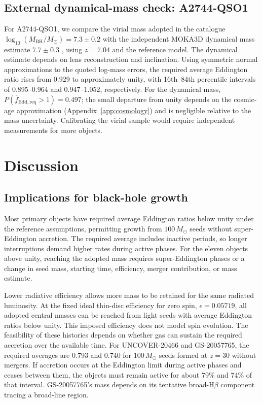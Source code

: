 \documentclass[pdflatex,sn-basic]{sn-jnl}
\newcommand{\mbh}{M_{\mathrm{BH}}}
\begin{document}
\subsection{External dynamical-mass check: A2744-QSO1}
\label{sec:direct}

For A2744-QSO1, we compare the virial mass adopted in the catalogue
$\log_{10}(\mbh/M_\odot)=7.3\pm0.2$ \citep{greene2024} with the independent MOKA3D dynamical mass estimate $7.7\pm0.3$ \citep{juodzbalis_direct2025}, using $z=7.04$
and the reference model. The dynamical estimate depends on lens reconstruction and inclination.
Using symmetric normal approximations to the quoted log-mass errors, the
required average Eddington ratio rises from 0.929 to approximately unity, with
16th--84th percentile intervals of 0.895--0.964 and 0.947--1.052,
respectively. For the dynamical mass, $P(\overline{f}_{\mathrm{Edd,req}}>1)=0.497$;
the small departure from unity depends on the cosmic-age approximation
(Appendix~\ref{app:cosmology}) and is negligible relative to the mass uncertainty.
Calibrating the virial sample would require independent measurements for more objects.

\section{Discussion}

\subsection{Implications for black-hole growth}
\label{sec:individual-growth}

Most primary objects have required average Eddington ratios below unity
under the reference assumptions, permitting growth from $100\,M_\odot$ seeds
without super-Eddington accretion. The required average includes inactive
periods, so longer interruptions demand higher rates during active phases.
For the eleven objects above unity, reaching the adopted mass requires
super-Eddington phases or a change in seed mass, starting time, efficiency,
merger contribution, or mass estimate.

Lower radiative efficiency allows more mass to be retained for the same
radiated luminosity. At the fixed ideal thin-disc efficiency for zero spin, $\epsilon=0.05719$,
all adopted central masses can be reached from light seeds with average
Eddington ratios below unity. This imposed efficiency does not model spin evolution.
The feasibility of these histories depends on whether gas can sustain the
required accretion over the available time.
For UNCOVER-20466 and GS-20057765, the required averages are 0.793 and
0.740 for $100\,M_\odot$ seeds formed at $z=30$ without mergers. If accretion
occurs at the Eddington limit during active phases and ceases between them,
the objects must remain active for about 79\% and 74\% of that interval.
GS-20057765's mass depends on its tentative broad-H$\beta$ component
tracing a broad-line region.
\end{document}

